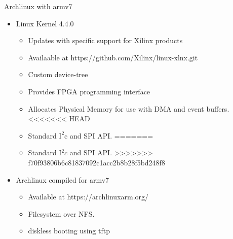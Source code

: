 
Archlinux with armv7

\begin{itemize}
\item Linux Kernel 4.4.0
  \begin{itemize}
  \item Updates with specific support for Xilinx products
  \item Availaable at https://github.com/Xilinx/linux-xlnx.git
  \item Custom device-tree
  \item Provides FPGA programming interface
  \item Allocates Physical Memory for use with DMA and event buffers.
<<<<<<< HEAD
  \item Standard $\mathrm{I^{2}c}$ and SPI API.
=======
  \item Standard I$^2c$ and SPI API.
>>>>>>> f70f93806b6c81837092c1acc2b8b28f5bd248f8
  \end{itemize}

\item Archlinux compiled for armv7
  \begin{itemize}
  \item Available at https://archlinuxarm.org/
  \item Filesystem over NFS.
  \item diskless booting using tftp
  \end{itemize}

\end{itemize}
